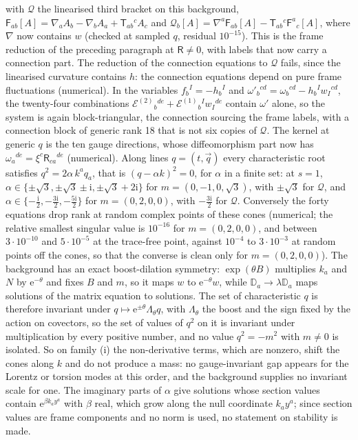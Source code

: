 with \(\mathcal Q\) the linearised third bracket on this background, \(\mathsf F_{ab}[A]=\nabla_aA_b-\nabla_bA_a+\mathsf T_{ab}{}^cA_c\) and \(\mathcal Q_b[A]=\nabla^a\mathsf F_{ab}[A]-\mathsf T_{ab}{}^c\mathsf F^a{}_c[A]\), where \(\nabla\) now contains \(w\) (checked at sampled \(q\), residual \(10^{-15}\)). This is the frame reduction of the preceding paragraph at \(\mathsf R\neq0\), with labels that now carry a connection part. The reduction of the connection equations to \(\mathcal Q\) fails, since the linearised curvature contains \(h\): the connection equations depend on pure frame fluctuations (numerical). In the variables \(f_b{}^I=-h_b{}^I\) and \(\omega'_b{}^{cd}=\omega_b{}^{cd}-h_b{}^Iw_I{}^{cd}\), the twenty-four combinations \(\mathcal E^{(2)}{}_b{}^{de}+\mathcal E^{(1)}{}_b{}^Iw_I{}^{de}\) contain \(\omega'\) alone, so the system is again block-triangular, the connection sourcing the frame labels, with a connection block of generic rank 18 that is not six copies of \(\mathcal Q\). The kernel at generic \(q\) is the ten gauge directions, whose diffeomorphism part now has \(\omega_a{}^{de}=\xi^c\mathsf R_{ca}{}^{de}\) (numerical). Along lines \(q=(t,\vec q)\) every characteristic root satisfies \(q^2=2\alpha\,k^aq_a\), that is \((q-\alpha k)^2=0\), for \(\alpha\) in a finite set: at \(s=1\), \(\alpha\in\{\pm\sqrt3,\pm\sqrt3\pm\mathrm i,\pm\sqrt3+2\mathrm i\}\) for \(m=(0,-1,0,\sqrt3)\), with \(\pm\sqrt3\) for \(\mathcal Q\), and \(\alpha\in\{-\tfrac{\mathrm i}2,-\tfrac{3\mathrm i}2,-\tfrac{5\mathrm i}2\}\) for \(m=(0,2,0,0)\), with \(-\tfrac{3\mathrm i}2\) for \(\mathcal Q\). Conversely the forty equations drop rank at random complex points of these cones (numerical; the relative smallest singular value is \(10^{-16}\) for \(m=(0,2,0,0)\), and between \(3\cdot10^{-10}\) and \(5\cdot10^{-5}\) at the trace-free point, against \(10^{-4}\) to \(3\cdot10^{-3}\) at random points off the cones, so that the converse is clean only for \(m=(0,2,0,0)\)). The background has an exact boost-dilation symmetry: \(\exp(\theta B)\) multiplies \(k_a\) and \(N\) by \(\mathrm e^{-\theta}\) and fixes \(B\) and \(m\), so it maps \(w\) to \(\mathrm e^{-\theta}w\), while \(\mathbb D_a\to\lambda\mathbb D_a\) maps solutions of the matrix equation to solutions. The set of characteristic \(q\) is therefore invariant under \(q\mapsto\mathrm e^{\pm\theta}\Lambda_\theta q\), with \(\Lambda_\theta\) the boost and the sign fixed by the action on covectors, so the set of values of \(q^2\) on it is invariant under multiplication by every positive number, and no value \(q^2=-m^2\) with \(m\neq0\) is isolated. So on family (i) the non-derivative terms, which are nonzero, shift the cones along \(k\) and do not produce a mass: no gauge-invariant gap appears for the Lorentz or torsion modes at this order, and the background supplies no invariant scale for one. The imaginary parts of \(\alpha\) give solutions whose section values contain \(\mathrm e^{\beta k_ay^a}\) with \(\beta\) real, which grow along the null coordinate \(k_ay^a\); since section values are frame components and no norm is used, no statement on stability is made.

